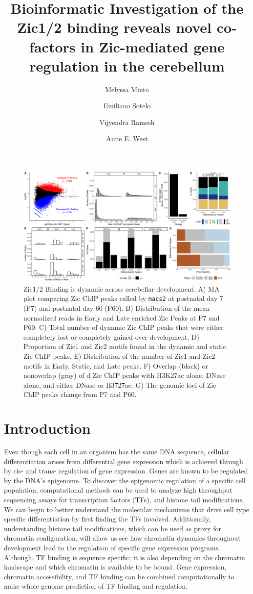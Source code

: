 \documentclass[fleqn,10pt]{wlscirep}
\title{Bioinformatic Investigation of the Zic1/2 binding  reveals novel co-factors in Zic-mediated gene regulation in the cerebellum}
\author[1]{Melyssa Minto}
\author[2]{Emiliano Sotelo}
\author[3]{Vijyendra  Ramesh}
\author[3,*]{Anne E. West}
\affil[1]{Duke University, Computational Biology and Bioinformatics, Durham, 27710}
\affil[2]{Duke University, University Program of Genetics and Genomics, Durham, 27710}
\affil[3]{Duke University, Neurobiology, Durham, 27710}
\affil[*]{corresponding author: west@neuro.duke.edu}
\begin{document}
\flushbottom
\maketitle
\thispagestyle{empty}

\begin{figure}[ht]
\centering
\includegraphics[width=.95\textwidth]{../figures/figure1.png}
\caption{ Zic1/2 Binding is dynamic across cerebellar development. A) MA plot comparing Zic ChIP peaks called by \texttt{macs2} at postnatal day 7 (P7) and postnatal day 60 (P60). B) Distribution of the mean normalized reads in Early and Late enriched Zic Peaks at P7 and P60. C) Total number of  dynamic Zic ChIP peaks that were either completely lost or completely gained over development. D) Proportion of Zic1 and Zic2 motifs found in the dynamic and static Zic ChIP peaks. E) Distribution of the number of Zic1 and Zic2 motifs in Early, Static, and Late peaks. F) Overlap (black) or nonoverlap (gray) of d Zic ChIP peaks with H3K27ac alone, DNase alone, and either DNase or H3727ac. G) The genomic loci of Zic ChIP peaks change from P7 and P60.}
\label{fig:ZicPeaks}
\end{figure}





\section*{Introduction}
Even though each cell in an organism has the same DNA sequence, cellular differentiation arises from differential gene expression which is achieved through by cis- and trans- regulation of gene expression. Genes are known to be regulated by the DNA’s epigenome. To discover the epigenomic regulation of a specific cell population, computational methods can be used to analyze high throughput sequencing assays for transcription factors (TFs), and histone tail modifications. We can begin to better understand the molecular mechanisms that drive cell type specific differentiation by first finding the TFs involved. Additionally, understanding histone tail modifications, which can be used as proxy for chromatin configuration, will allow us see how chromatin dynamics throughout development lead to the regulation of specific gene expression programs. Although, TF binding is sequence specific; it is also depending on the chromatin landscape and which chromatin is available to be bound. Gene expression, chromatin accessibility, and TF binding can be combined computationally to make whole genome prediction of TF binding and regulation.
\end{document}
